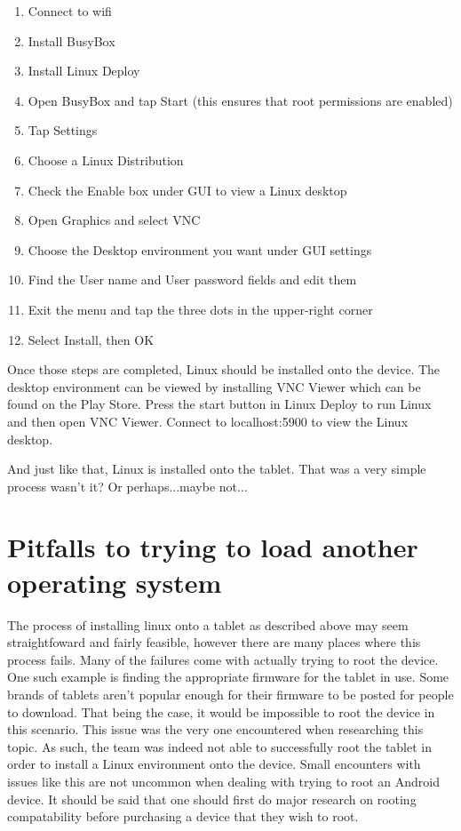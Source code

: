 \begin{enumerate}

\item Connect to wifi

\item Install BusyBox

\item Install Linux Deploy

\item Open BusyBox and tap Start (this ensures that root permissions are enabled)

\item Tap Settings

\item Choose a Linux Distribution

\item Check the Enable box under GUI to view a Linux desktop

\item Open Graphics and select VNC

\item Choose the Desktop environment you want under GUI settings

\item Find the User name and User password fields and edit them 

\item Exit the menu and tap the three dots in the upper-right corner

\item Select Install, then OK

\end{enumerate}

Once those steps are completed, Linux should be installed onto the device. The desktop environment can be viewed by installing VNC Viewer which 
can be found on the Play Store. Press the start button in Linux Deploy to run Linux and then open VNC Viewer. Connect to localhost:5900 to view 
the Linux desktop.

And just like that, Linux is installed onto the tablet. That was a very simple process wasn't it? Or perhaps...maybe not...

\section{Pitfalls to trying to load another operating system}
The process of installing linux onto a tablet as described above may seem straightfoward and fairly feasible, however there are many places where this 
process fails. Many of the failures come with actually trying to root the device. One such example is finding the appropriate firmware for the tablet in use. 
Some brands of tablets aren't popular enough for their firmware to be posted for people to download. That being the case, it would be impossible to root 
the device in this scenario. This issue was the very one encountered when researching this topic. As such, the team was indeed not able to successfully root the 
tablet in order to install a Linux environment onto the device. Small encounters with issues like this are not uncommon when dealing with trying to root an 
Android device. It should be said that one should first do major research on rooting compatability before purchasing a device that they wish to root.
